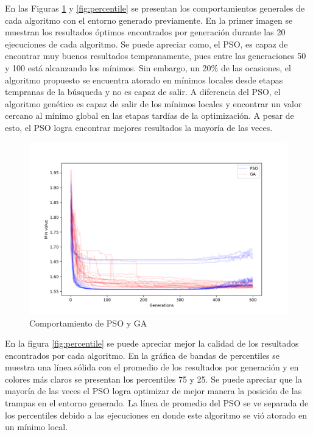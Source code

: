   En las Figuras \ref{fig:average-results} y \ref{fig:percentile} se presentan
  los comportamientos generales de cada algoritmo con el entorno generado
  previamente. En la primer imagen se muestran los resultados óptimos
  encontrados por generación durante las 20 ejecuciones de cada algoritmo. Se
  puede apreciar como, el PSO, es capaz de encontrar muy buenos resultados
  tempranamente, pues entre las generaciones 50 y 100 está alcanzando los
  mínimos. Sin embargo, un 20\% de las ocasiones, el algoritmo propuesto se
  encuentra atorado en mínimos locales desde etapas tempranas de la búsqueda y
  no es capaz de salir. A diferencia del PSO, el algoritmo genético es capaz
  de salir de los mínimos locales y encontrar un valor cercano al mínimo
  global en las etapas tardías de la optimización. A pesar de esto, el PSO
  logra encontrar mejores resultados la mayoría de las veces.

  \begin{figure}[ht!]
    \centering
    \includegraphics[width=\textwidth]{average-results.png}
    \caption{Comportamiento de PSO y GA}
    \label{fig:average-results}
  \end{figure}

  En la figura \ref{fig:percentile} se puede apreciar mejor la calidad de los
  resultados encontrados por cada algoritmo. En la gráfica de bandas de
  percentiles se muestra una línea sólida con el promedio de los resultados
  por generación y en colores más claros se presentan los percentiles 75 y 25.
  Se puede apreciar que la mayoría de las veces el PSO logra optimizar de
  mejor manera la posición de las trampas en el entorno generado. La línea de
  promedio del PSO se ve separada de los percentiles debido a las ejecuciones
  en donde este algoritmo se vió atorado en un mínimo local.


